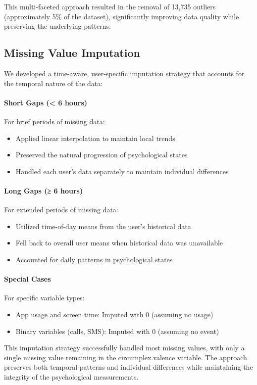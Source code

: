 This multi-faceted approach resulted in the removal of 13,735 outliers (approximately 5\% of the dataset), significantly improving data quality while preserving the underlying patterns.

\subsection{Missing Value Imputation}
We developed a time-aware, user-specific imputation strategy that accounts for the temporal nature of the data:

\paragraph{Short Gaps (< 6 hours)}
For brief periods of missing data:
\begin{itemize}
    \item Applied linear interpolation to maintain local trends
    \item Preserved the natural progression of psychological states
    \item Handled each user's data separately to maintain individual differences
\end{itemize}

\paragraph{Long Gaps (≥ 6 hours)}
For extended periods of missing data:
\begin{itemize}
    \item Utilized time-of-day means from the user's historical data
    \item Fell back to overall user means when historical data was unavailable
    \item Accounted for daily patterns in psychological states
\end{itemize}

\paragraph{Special Cases}
For specific variable types:
\begin{itemize}
    \item App usage and screen time: Imputed with 0 (assuming no usage)
    \item Binary variables (calls, SMS): Imputed with 0 (assuming no event)
\end{itemize}

This imputation strategy successfully handled most missing values, with only a single missing value remaining in the circumplex.valence variable. The approach preserves both temporal patterns and individual differences while maintaining the integrity of the psychological measurements.
